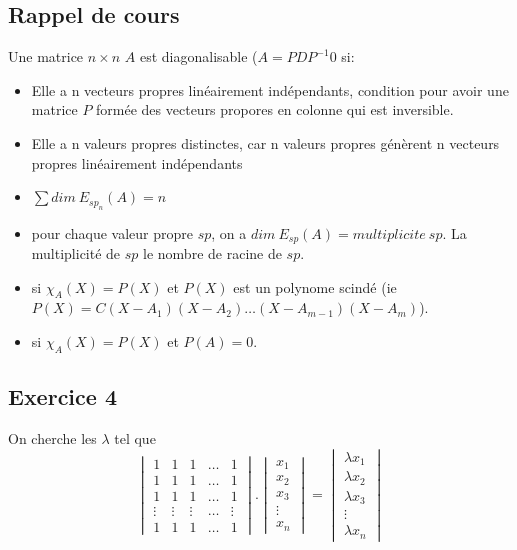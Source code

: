 \documentclass[]{book}
\theoremstyle{definition}
\begin{document}
\subsection*{Rappel de cours}
Une matrice $n \times n$ $A$ est diagonalisable ($A = PDP^{-1}$0 si:
\begin{itemize}
\item Elle a n vecteurs propres lin\'eairement ind\'ependants, condition pour avoir une matrice $P$ form\'ee des vecteurs propores en colonne qui est inversible. 
\item Elle a n valeurs propres distinctes, car n valeurs propres g\'en\`erent n vecteurs propres lin\'eairement ind\'ependants
\item $\sum{dim\ E_{sp_n}(A)} = n$
\item pour chaque valeur propre $sp$, on a $dim\ E_{sp}(A) = multiplicite\ sp$. La multiplicit\'e de $sp$ le nombre de racine de $sp$.
\item si $\chi_{A}(X) = P(X)$ et $P(X)$ est un polynome scind\'e (ie $P(X) = C(X-A_1)(X-A_2)\ldots(X-A_{m-1})(X-A_m)$).
\item si $\chi_{A}(X) = P(X)$ et $P(A)=0$.
\end{itemize}


\newpage
\subsection*{Exercice 4}

On cherche les $\lambda$ tel que
$$ \begin{vmatrix} 1 & 1 & 1 & \ldots & 1 \\ 1 & 1 & 1 & \ldots & 1 \\ 1 & 1 & 1 & \ldots & 1 \\ \vdots & \vdots & \vdots & \ldots & \vdots \\ 1 & 1 & 1 & \ldots & 1 \end{vmatrix} . \begin{vmatrix} x_1 \\ x_2 \\ x_3 \\ \vdots \\ x_n \end{vmatrix} = \begin{vmatrix} \lambda x_1 \\ \lambda x_2 \\ \lambda x_3 \\ \vdots \\ \lambda x_n \end{vmatrix}$$
\end{document}
